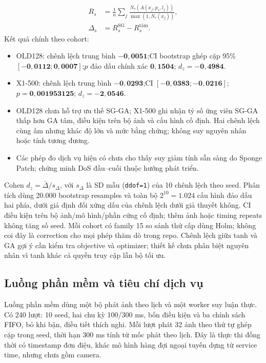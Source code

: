 \documentclass[a4paper,fleqn]{cas-dc}
\begin{document}
\begin{equation}
\begin{aligned}
R_s&=\frac1n\sum_j\frac{N_\tau(A(x_j,p_s,l_j))}{\max(1,N_\tau(x_j))},\\
\Delta_s&=R_s^{\mathrm{SG}}-R_s^{\text{tâm}}.
\end{aligned}
\tag{3}
\end{equation}
Kết quả chính theo cohort:
\begin{itemize}
\item OLD128: chênh lệch trung bình $\mathbf{-0{,}0051}$;\newline CI bootstrap ghép cặp 95\% $\mathbf{[-0{,}0112;0{,}0007]}$;\newline $p$ đảo dấu chính xác $\mathbf{0{,}1504}$; $d_z=\mathbf{-0{,}4984}$.
\item X1-500: chênh lệch trung bình $\mathbf{-0{,}0293}$;\newline CI $\mathbf{[-0{,}0383;-0{,}0216]}$; $p=\mathbf{0{,}001953125}$; $d_z=\mathbf{-2{,}0546}$.
\item OLD128 chưa hỗ trợ ưu thế SG-GA; X1-500 ghi nhận tỷ số ứng viên SG-GA thấp hơn GA tâm, điều kiện trên bộ ảnh và cấu hình cố định. Hai chênh lệch cùng âm nhưng khác độ lớn và mức bằng chứng; không suy nguyên nhân hoặc tính tương đương.
\item Các phép đo dịch vụ hiện có chưa cho thấy suy giảm tính sẵn sàng do Sponge Patch; chứng minh DoS đầu--cuối thuộc hướng phát triển.
\end{itemize}
Cohen $d_z=\bar\Delta/s_\Delta$, với $s_\Delta$ là SD mẫu (\texttt{ddof=1}) của 10 chênh lệch theo seed. Phân tích dùng 20.000 bootstrap resamples và toàn bộ $2^{10}=1.024$ cấu hình đảo dấu hai phía, dưới giả định đối xứng dấu của chênh lệch dưới giả thuyết không. CI điều kiện trên bộ ảnh/mô hình/phần cứng cố định; thêm ảnh hoặc timing repeats không tăng số seed. Mỗi cohort có family 15 so sánh thứ cấp dùng Holm; không coi đây là correction cho mọi phép thăm dò trong repo. Chênh lệch giữa tanh và GA gợi ý cần kiểm tra objective và optimizer; thiết kế chưa phân biệt nguyên nhân vì tanh khác cả quyền truy cập lẫn bộ tối ưu.

\subsection{Luồng phần mềm và tiêu chí dịch vụ}

Luồng phần mềm dùng một bộ phát ảnh theo lịch và một worker suy luận thực. Có 240 lượt: 10 seed, hai chu kỳ 100/300 ms, bốn điều kiện và ba chính sách FIFO, bỏ khi bận, điều tiết thích nghi. Mỗi lượt phát 32 ảnh theo thứ tự ghép cặp trong seed, thời hạn 300 ms tính từ mốc phát theo lịch. Đây là thực thi đồng thời có timestamp đơn điệu, khác mô hình hàng đợi ngoại tuyến dựng từ service time, nhưng chưa gồm camera.
\end{document}
